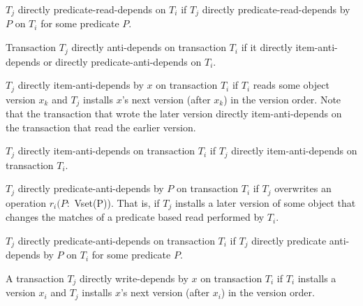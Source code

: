\begin{definition}
$T_j$ directly predicate-read-depends on $T_i$ if $T_j$ directly
  predicate-read-depends by $P$ on $T_i$ for some predicate $P$.
\end{definition}

\begin{definition}
Transaction $T_j$ directly anti-depends on transaction $T_i$ if it
directly item-anti-depends or directly predicate-anti-depends on
$T_i$.
\end{definition}

\begin{definition}
$T_j$ directly item-anti-depends by $x$ on transaction $T_i$ if $T_i$
  reads some object version $x_k$ and $T_j$ installs $x$'s next
  version (after $x_k$) in the version order. Note that the
  transaction that wrote the later version directly item-anti-depends
  on the transaction that read the earlier version.
\end{definition}

\begin{definition}
$T_j$ directly item-anti-depends on transaction $T_i$ if $T_j$
  directly item-anti-depends on transaction $T_i$.
\end{definition}

\begin{definition}
$T_j$ directly predicate-anti-depends by $P$ on transaction $T_i$ if
  $T_j$ overwrites an operation $r_i(P:$ Vset(P)). That is, if $T_j$
  installs a later version of some object that changes the matches of
  a predicate based read performed by $T_i$.
\end{definition}

\begin{definition}
$T_j$ directly predicate-anti-depends on transaction $T_i$ if $T_j$
  directly predicate anti-depends by $P$ on $T_i$ for some predicate
  $P$.
\end{definition}

\begin{definition}
A transaction $T_j$ directly write-depends by $x$ on transaction $T_i$
if $T_i$ installs a version $x_i$ and $T_j$ installs $x$'s next
version (after $x_i$) in the version order.
\end{definition}

